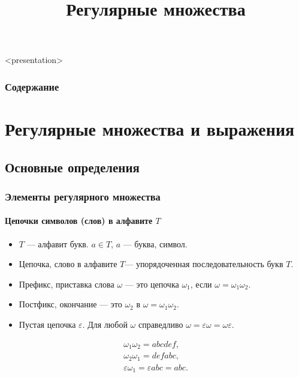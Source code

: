 


\title[Регулярные множества]{Регулярные множества}





\begin{frame}<presentation>
    \frametitle{Содержание}
    \tableofcontents
\end{frame}


\section{Регулярные множества и выражения}

\subsection{Основные определения}

\begin{frame}
    \frametitle{Элементы регулярного множества}
    \framesubtitle{Цепочки символов (слов) в алфавите $T$}
    
    \begin{definition}
        \begin{itemize}
            \item $T$ --- \alert{алфавит} букв. $a\in T$, $a$ --- \alert{буква}, \alert{символ}.
            \item \alert{Цепочка}, \alert{слово} в алфавите $T$--- упорядоченная последовательность букв $T$.
            \item \alert{Префикс}, \alert{приставка} слова $\omega$ --- это цепочка $\omega_1$, если $\omega=\omega_1\omega_2$.
            \item \alert{Постфикс}, \alert{окончание} --- это $\omega_2$ в $\omega=\omega_1\omega_2$.
            \item \alert{Пустая} цепочка $\varepsilon$. Для любой $\omega$ справедливо $\omega=\varepsilon\omega=\omega\varepsilon$.
        \end{itemize}
    \end{definition}
    \begin{example}[Конкатенация цепочек. $\omega_1=abc$, $\omega_2=def$]
        \[
            \begin{array}{l}
                \omega_1\omega_2=abcdef,\\
                \omega_2\omega_1=defabc,\\
                \varepsilon\omega_1={\varepsilon}abc=abc.
            \end{array}
        \]
    \end{example}
\end{frame}


